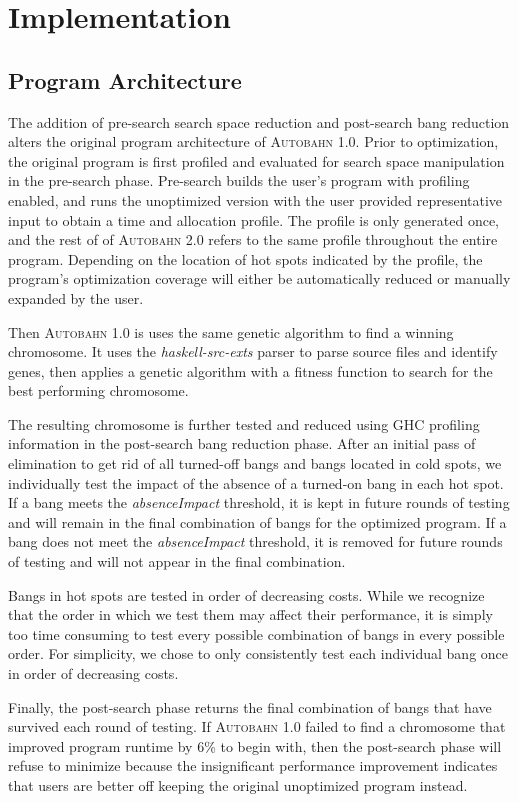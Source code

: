 \documentclass[format=sigplan, review=true]{acmart}
\newcommand{\hotspot}[0]{hot spot}
\newcommand{\hotspots}[0]{hot spots}
\newcommand{\coldspots}[0]{cold spots}
\newcommand{\Ao}[0]{\textsc{Autobahn 1.0}}
\newcommand{\At}[0]{\textsc{Autobahn 2.0}}
\newcommand{\preopt}[0]{pre-search}
\newcommand{\postopt}[0]{post-search}
\newcommand{\Preopt}[0]{Pre-search}
\newcommand{\absim}[0]{\textit{absenceImpact}}
\begin{document}
\section{Implementation}

\subsection{Program Architecture}

The addition of \preopt{} search space reduction and \postopt{} bang reduction alters the original program architecture of \Ao{}. Prior to optimization, the original program is first profiled and evaluated for search space manipulation in the \preopt{} phase. \Preopt{} builds the user's program with profiling enabled, and runs the unoptimized version with the user provided representative input to obtain a time and allocation profile. The profile is only generated once, and the rest of of \At{} refers to the same profile throughout the entire program. Depending on the location of \hotspots{} indicated by the profile, the program's optimization coverage will either be automatically reduced or manually expanded by the user. 

Then \Ao{} is uses the same genetic algorithm to find a winning chromosome. It uses the \textit{haskell-src-exts} parser to parse source files and identify genes, then applies a genetic algorithm with a fitness function to search for the best performing chromosome.

The resulting chromosome is further tested and reduced using GHC profiling information in the \postopt{} bang reduction phase. After an initial pass of elimination to get rid of all turned-off bangs and bangs located in \coldspots{}, we individually test the impact of the absence of a turned-on bang in each \hotspot{}. If a bang meets the \absim{} threshold, it is kept in future rounds of testing and will remain in the final combination of bangs for the optimized program. If a bang does not meet the \absim{} threshold, it is removed for future rounds of testing and will not appear in the final combination. 

Bangs in \hotspots{} are tested in order of decreasing costs. While we recognize that the order in which we test them may affect their performance, it is simply too time consuming to test every possible combination of bangs in every possible order. For simplicity, we chose to only consistently test each individual bang once in order of decreasing costs. 

Finally, the \postopt{} phase returns the final combination of bangs that have survived each round of testing. If \Ao{} failed to find a chromosome that improved program runtime by 6\% to begin with, then the \postopt{} phase will refuse to minimize because the insignificant performance improvement indicates that users are better off keeping the original unoptimized program instead.
\end{document}
